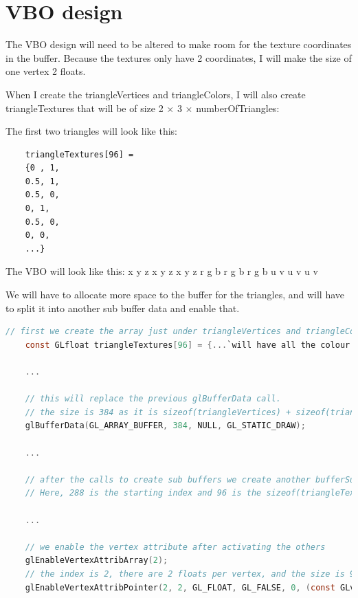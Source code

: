 \documentclass[10pt]{report}
\begin{document}
\section{VBO design}
The VBO design will need to be altered to make room for the texture coordinates in the buffer. Because the textures only have 2 coordinates, I will make the size of one vertex 2 floats.

When I create the triangleVertices and triangleColors, I will also create triangleTextures that will be of size 2 $\times$ 3 $\times$ numberOfTriangles: 

The first two triangles will look like this:
\begin{verbatim}
    triangleTextures[96] = 
    {0 , 1,
    0.5, 1,
    0.5, 0,
    0, 1,
    0.5, 0,
    0, 0,
    ...}
\end{verbatim}

The VBO will look like this: x y z x y z x y z r g b r g b r g b u v u v u v 

We will have to allocate more space to the buffer for the triangles, and will have to split it into another sub buffer data and enable that.

\begin{lstlisting}[language=c]
    // first we create the array just under triangleVertices and triangleColours
    const GLfloat triangleTextures[96] = {...`will have all the colour data here as floats`...}

    ...

    // this will replace the previous glBufferData call.
    // the size is 384 as it is sizeof(triangleVertices) + sizeof(triangleColors) + sizeof(triangleTextures)
    glBufferData(GL_ARRAY_BUFFER, 384, NULL, GL_STATIC_DRAW);

    ...

    // after the calls to create sub buffers we create another bufferSubData for the textures
    // Here, 288 is the starting index and 96 is the sizeof(triangleTextures) glBufferSubData(GL_ARRAY_BUFFER, 288, 144, triangleTextures); // textures

    ...

    // we enable the vertex attribute after activating the others
    glEnableVertexAttribArray(2);
    // the index is 2, there are 2 floats per vertex, and the size is 96
    glEnableVertexAttribPointer(2, 2, GL_FLOAT, GL_FALSE, 0, (const GLvoid*) 96);

\end{lstlisting}
\end{document}
